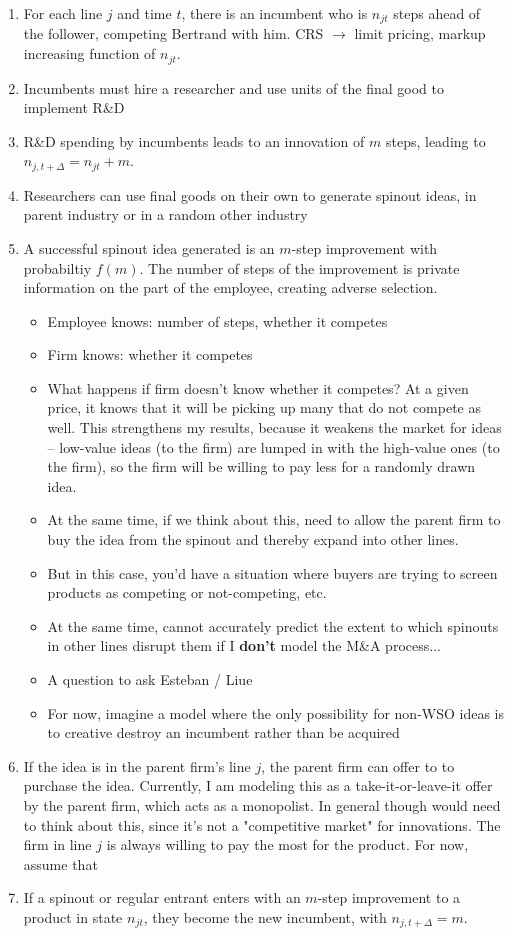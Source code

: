 \documentclass[12pt,english]{article}
\theoremstyle{remark}
\begin{document}
\begin{enumerate}
	\item For each line $j$ and time $t$, there is an incumbent who is $n_{jt}$ steps ahead of the follower, competing Bertrand with him. CRS $\rightarrow$ limit pricing, markup increasing function of $n_{jt}$. 
	\item Incumbents must hire a researcher and use units of the final good to implement R\&D
	\item R\&D spending by incumbents leads to an innovation of $m$ steps, leading to $n_{j,t+\Delta} = n_{jt} + m$. 
	\item Researchers can use final goods on their own to generate spinout ideas, in parent industry or in a random other industry
	\item A successful spinout idea generated is an $m$-step improvement with probabiltiy $f(m)$. The number of steps of the improvement is private information on the part of the employee, creating adverse selection.
	\begin{itemize}
		\item Employee knows: number of steps, whether it competes
		\item Firm knows: whether it competes
		\item What happens if firm doesn't know whether it competes? At a given price, it knows that it will be picking up many that do not compete as well. This strengthens my results, because it weakens the market for ideas -- low-value ideas (to the firm) are lumped in with the high-value ones (to the firm), so the firm will be willing to pay less for a randomly drawn idea.  
		\item At the same time, if we think about this, need to allow the parent firm to buy the idea from the spinout and thereby expand into other lines. 
		\item But in this case, you'd have a situation where buyers are trying to screen products as competing or not-competing, etc.
		\item At the same time, cannot accurately predict the extent to which spinouts in other lines disrupt them if I \textbf{don't} model the M\&A process...
		\item A question to ask Esteban / Liue
		\item For now, imagine a model where the only possibility for non-WSO ideas is to creative destroy an incumbent rather than be acquired
	\end{itemize}
	\item If the idea is in the parent firm's line $j$, the parent firm can offer to to purchase the idea. Currently, I am modeling this as a take-it-or-leave-it offer by the parent firm, which acts as a monopolist. In general though would need to think about this, since it's not a "competitive market" for innovations. The firm in line $j$ is always willing to pay the most for the product. For now, assume that 
	\item If a spinout or regular entrant enters with an $m$-step improvement to a product in state $n_{jt}$, they become the new incumbent, with $n_{j,t+\Delta} = m$.
\end{enumerate}
\end{document}

